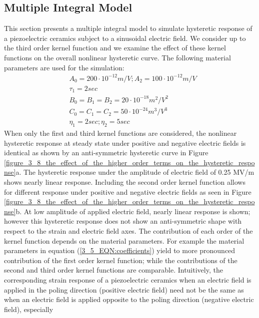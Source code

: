 \subsection{Multiple Integral Model}
This section presents a multiple integral model to simulate hysteretic response of a piezoelectric ceramics subject to a sinusoidal electric field. 
We consider up to the third order kernel function and we examine the effect of these kernel functions on the overall nonlinear hysteretic curve. 
The following material parameters are used for the simulation:
\begin{equation}
\begin{aligned}
&A_0=200 \cdot 10^{-12} m/V; A_2=100 \cdot 10^{-12} m/V \\
&\tau_1=2 sec \\
&B_0=B_1=B_2=20 \cdot 10^{-18} m^2/V^2 \\
&C_0=C_1=C_2=50 \cdot 10^{-24} m^3/V^3 \\
&\eta_1=2sec; \eta_2=5 sec  
\end{aligned}
\label{3_5_EQN:coefficients}
\end{equation}
When only the first and third kernel functions are considered, the nonlinear hysteretic response at steady state under positive and negative electric fields is identical as shown by an anti-symmetric hysteretic curve in Figure \ref{figure_3_8_the_effect_of_the_higher_order_terms_on_the_hysteretic_response}a. 
The hysteretic response under the amplitude
of electric field of 0.25 MV/m shows nearly linear response. Including the second order
kernel function allows for different response under positive and negative electric fields as
seen in Figure \ref{figure_3_8_the_effect_of_the_higher_order_terms_on_the_hysteretic_response}b. At low amplitude of applied electric field, nearly linear response is shown;
however this hysteretic response does not show an anti-symmetric shape with respect to the
strain and electric field axes. The contribution of each order of the kernel function depends
on the material parameters. For example the material parameters in equation (\ref{3_5_EQN:coefficients}) yield to more
pronounced contribution of the first order kernel function; while the contributions of the
second and third order kernel functions are comparable.
Intuitively, the corresponding strain response of a piezoelectric ceramics when an electric
field is applied in the poling direction (positive electric field) need not be the same as when
an electric field is applied opposite to the poling direction (negative electric field), especially
